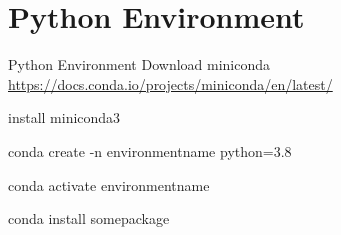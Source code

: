 \documentclass{beamer}
\begin{document}
\section{Python Environment}
\begin{frame}{Python Environment}
    Download miniconda \url{https://docs.conda.io/projects/miniconda/en/latest/}

    install miniconda3

    conda create -n environmentname python=3.8

    conda activate environmentname

    conda install somepackage

\end{frame}
\end{document}
